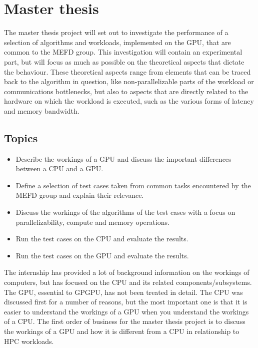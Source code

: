 \chapter{Master thesis}

\hspace{4mm} The master thesis project will set out to investigate the performance of a selection of algorithms and workloads, implemented on the GPU, that are common to the MEFD group. This investigation will contain an experimental part, but will focus as much as possible on the theoretical aspects that dictate the behaviour. These theoretical aspects range from elements that can be traced back to the algorithm in question, like non-parallelizable parts of the workload or communications bottlenecks, but also to aspects that are directly related to the hardware on which the workload is executed, such as the various forms of latency and memory bandwidth.\\

\section{Topics}

\begin{itemize}
    \item Describe the workings of a GPU and discuss the important differences between a CPU and a GPU.
    \item Define a selection of test cases taken from common tasks encountered by the MEFD group and explain their relevance.
    \item Discuss the workings of the algorithms of the test cases with a focus on parallelizability, compute and memory operations.
    \item Run the test cases on the CPU and evaluate the results.
    \item Run the test cases on the GPU and evaluate the results.
\end{itemize}

\hspace{3mm}

The internship has provided a lot of background information on the workings of computers, but has focused on the CPU and its related components/subsystems. The GPU, essential to GPGPU, has not been treated in detail. The CPU was discussed first for a number of reasons, but the most important one is that it is easier to understand the workings of a GPU when you understand the workings of a CPU. The first order of business for the master thesis project is to discuss the workings of a GPU and how it is different from a CPU in relationship to HPC workloads.\\

